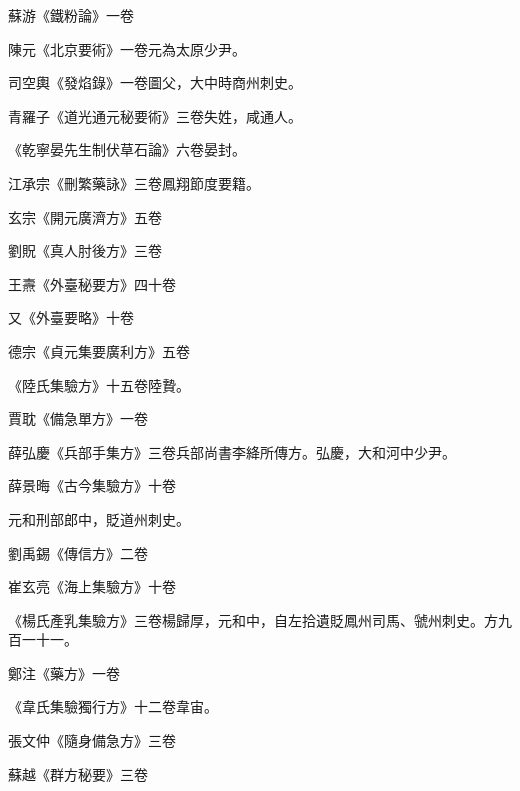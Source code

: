 \begin{pinyinscope}
 蘇游《鐵粉論》一卷



 陳元《北京要術》一卷元為太原少尹。



 司空輿《發焰錄》一卷圖父，大中時商州刺史。



 青羅子《道光通元秘要術》三卷失姓，咸通人。



 《乾寧晏先生制伏草石論》六卷晏封。



 江承宗《刪繁藥詠》三卷鳳翔節度要籍。



 玄宗《開元廣濟方》五卷



 劉貺《真人肘後方》三卷



 王燾《外臺秘要方》四十卷



 又《外臺要略》十卷



 德宗《貞元集要廣利方》五卷



 《陸氏集驗方》十五卷陸贄。



 賈耽《備急單方》一卷



 薛弘慶《兵部手集方》三卷兵部尚書李絳所傳方。弘慶，大和河中少尹。



 薛景晦《古今集驗方》十卷



 元和刑部郎中，貶道州刺史。



 劉禹錫《傳信方》二卷



 崔玄亮《海上集驗方》十卷



 《楊氏產乳集驗方》三卷楊歸厚，元和中，自左拾遺貶鳳州司馬、虢州刺史。方九百一十一。



 鄭注《藥方》一卷



 《韋氏集驗獨行方》十二卷韋宙。



 張文仲《隨身備急方》三卷



 蘇越《群方秘要》三卷




\end{pinyinscope}
